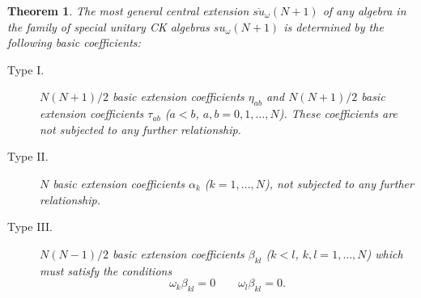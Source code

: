 \documentclass[12pt]{article}
\newtheorem{theorem}{Theorem}[section]
\begin{document}
\begin{theorem}
\label{theor3.1}
The most general central extension $\overline{su}_{\omega}(N+1)$ of
any algebra in the family of special unitary CK algebras
${su}_{\omega}(N+1)$ is determined by the following \emph{basic}
coefficients:
\begin{description}
\item[Type I.]
$N(N+1)/2$ basic extension coefficients ${\eta}_{ab}$ and
$N(N+1)/2$ basic extension coefficients ${\tau}_{ab}$  ($a<b$,
$a,b=0,1,\dots,N$). These coefficients are not subjected to any
further relationship.

\item[Type II.] $N$ basic extension coefficients ${\alpha}_{k}$
($k=1,\dots,N$), not subjected to any further relationship.

\item[Type III.] $N(N-1)/2$ basic extension coefficients ${\beta}_{kl}$
($k<l$, $k,l=1,\dots,N$) which must satisfy the conditions
\begin{equation}
{\omega}_k {\beta}_{kl}=0  \qquad {\omega}_l{\beta}_{kl}=0 .
\label{ECtaRestrict}
\end{equation}
\end{description}
\end{theorem}
\end{document}
